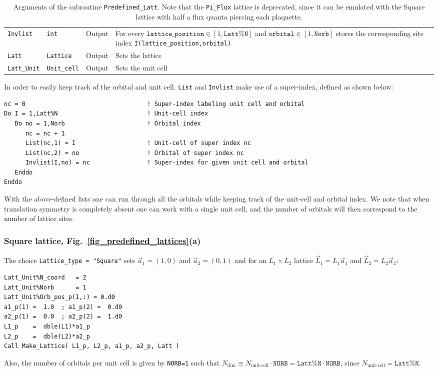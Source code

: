 \begin{table}[h!]
\begin{center}
\begin{tabular}{@{} p{}  p{} p{} p{}  @{}}
		\texttt{Invlist}         & \texttt{int}        & Output &  For every $\texttt{lattice\_position} \in [1,\texttt{Latt\%N}]$ and $\texttt{orbital} \in [1,\texttt{Norb}]$ stores the corresponding site index \texttt{I(lattice\_position,orbital)}\\
		\texttt{Latt}            & \texttt{Lattice}    & Output & Sets the lattice\\
		\texttt{Latt\_Unit}      & \texttt{Unit\_cell} & Output & Sets the unit cell\\
		\bottomrule
	\end{tabular}
\caption{Arguments of the subroutine \texttt{Predefined\_Latt}.   Note that the \texttt{Pi\_Flux} lattice is deprecated, since it can be emulated with the Square lattice with half a flux quanta piercing each plaquette.}		\label{table:predefined_lattices}
\end{center}
\end{table}

In order to easily keep track of the orbital and unit cell, \texttt{List} and \texttt{Invlist} make use of a super-index, defined as shown below:
\begin{lstlisting}[style=fortran]
nc = 0                                  ! Super-index labeling unit cell and orbital
Do I = 1,Latt%N                         ! Unit-cell index 
   Do no = 1,Norb                       ! Orbital index
      nc = nc + 1
      List(nc,1) = I                    ! Unit-cell of super index nc
      List(nc,2) = no                   ! Orbital of super index nc
      Invlist(I,no) = nc                ! Super-index for given unit cell and orbital
   Enddo
Enddo
\end{lstlisting}
With the above-defined lists one can run through all the orbitals while keeping track of the unit-cell and orbital index. We note that when translation symmetry is completely absent one can work with a single unit cell, and the number of orbitals will then correspond to the number of lattice sites. 


\subsubsection{Square lattice, Fig.~\ref{fig_predefined_lattices}(a)}

The choice \texttt{Lattice\_type = "Square"}   sets $\vec{a}_1 =  (1,0) $ and $\vec{a}_2 =  (0,1) $  and for an $L_1 \times L_2$  lattice  $\vec{L}_1 = L_1 \vec{a}_1$ and  $\vec{L}_2 = L_2 \vec{a}_2$:
\begin{lstlisting}[style=fortran]
Latt_Unit%N_coord   = 2
Latt_Unit%Norb      = 1
Latt_Unit%Orb_pos_p(1,:) = 0.d0 
a1_p(1) =  1.0  ; a1_p(2) =  0.d0
a2_p(1) =  0.0  ; a2_p(2) =  1.d0
L1_p    =  dble(L1)*a1_p
L2_p    =  dble(L2)*a2_p
Call Make_Lattice( L1_p, L2_p, a1_p, a2_p, Latt )
\end{lstlisting}
Also, the number of orbitals per unit cell is given by \texttt{NORB=1} such that   $N_{\mathrm{dim}}   \equiv N_{\text{unit-cell}}   \cdot \texttt{NORB}  = \texttt{Latt\%N} \cdot \texttt{NORB}$, since $N_{\text{unit-cell}} = \texttt{Latt\%N}$.


